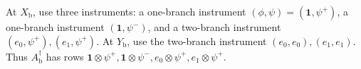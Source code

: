 At \(X_{\mathrm b}\), use three instruments: a one-branch instrument \((\phi,\psi)=(\mathbf 1,\psi^{+})\), a one-branch instrument \((\mathbf 1,\psi^{-})\), and a two-branch instrument \((e_0,\psi^{+}),(e_1,\psi^{+})\). At \(Y_{\mathrm b}\), use the two-branch instrument \((e_0,e_0),(e_1,e_1)\). Thus \(A_{\mathrm b}^{\dagger}\) has rows \(\mathbf 1\otimes\psi^{+},\mathbf 1\otimes\psi^{-},e_0\otimes\psi^{+},e_1\otimes\psi^{+}\).